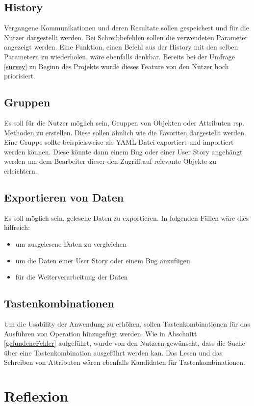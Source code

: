 \subsection{History}
Vergangene Kommunikationen und deren Resultate sollen gespeichert und für die Nutzer dargestellt werden.
Bei Schreibbefehlen sollen die verwendeten Parameter angezeigt werden.
Eine Funktion, einen Befehl aus der History mit den selben Parametern zu wiederholen, wäre ebenfalls denkbar.
Bereits bei der Umfrage \ref{survey} zu Beginn des Projekts wurde dieses Feature von den Nutzer hoch priorisiert.

\subsection{Gruppen}
Es soll für die Nutzer möglich sein, Gruppen von Objekten oder Attributen rsp. Methoden zu erstellen.
Diese sollen ähnlich wie die Favoriten dargestellt werden.
Eine Gruppe sollte beispielsweise als \ac{YAML}-Datei exportiert und importiert werden können.
Diese könnte dann einem Bug oder einer User Story angehängt werden um dem Bearbeiter dieser den Zugriff auf relevante Objekte zu erleichtern.

\subsection{Exportieren von Daten}
Es soll möglich sein, gelesene Daten zu exportieren.
In folgenden Fällen wäre dies hilfreich:
\begin{itemize}
   \item um ausgelesene Daten zu vergleichen
   \item um die Daten einer User Story oder einem Bug anzufügen
   \item für die Weiterverarbeitung der Daten
\end{itemize}

\subsection{Tastenkombinationen}
Um die Usability der Anwendung zu erhöhen, sollen Tastenkombinationen für das Ausführen von Operation hinzugefügt werden.
Wie in Abschnitt \ref{gefundeneFehler} aufgeführt, wurde von den Nutzern gewünscht, dass die Suche über eine Tastenkombination ausgeführt werden kan.
Das Lesen und das Schreiben von Attributen wären ebenfalls Kandidaten für Tastenkombinationen.


\section{Reflexion}

